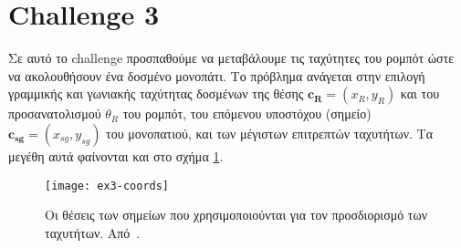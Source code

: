 \section{Challenge 3}\label{section:ex3}
Σε αυτό το challenge προσπαθούμε να μεταβάλουμε τις ταχύτητες του ρομπότ ώστε να ακολουθήσουν ένα δοσμένο μονοπάτι.
Το πρόβλημα ανάγεται στην επιλογή γραμμικής και γωνιακής ταχύτητας δοσμένων της
θέσης $\mathbf{c_R} = \left(x_R, y_R\right)$ και του προσανατολισμού $\theta_R$ του ρομπότ, του επόμενου υποστόχου (σημείο) $\mathbf{c_{sg}} = \left(x_{sg}, y_{sg}\right)$ του μονοπατιού, και των μέγιστων επιτρεπτών ταχυτήτων.
Τα μεγέθη αυτά φαίνονται και στο σχήμα \ref{fig:ex3-coords}.

\begin{figure}[htb]
    \centering
    \texttt{[image: ex3-coords]}
    \caption{Οι θέσεις των σημείων που χρησιμοποιούνται για τον προσδιορισμό των ταχυτήτων. Από~\protect\cite{etsardou-phd}.}\label{fig:ex3-coords}
\end{figure}

